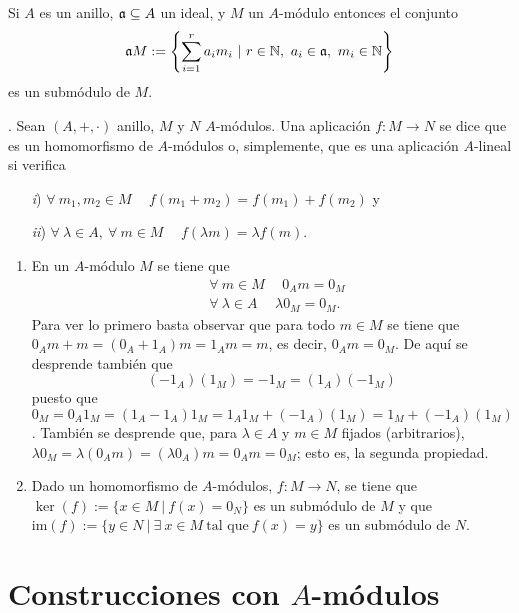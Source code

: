 \documentclass[../main.tex]{subfiles}
\begin{document}
\begin{remark} Si $A$ es un anillo, $\mathfrak{a}\subseteq A$ un ideal, y $M$ un $A$-módulo entonces el conjunto$$\af M:=\left\{\sum_{i=1}^ra_im_i\ |\ r\in\N,\ a_i\in\af,\ m_i\in\N\right\}$$es un submódulo de $M$.
\end{remark}

\begin{definition}. Sean $(A,+,\cdot)$ anillo, $M$ y $N$ $A$-módulos. Una aplicación $f:M\longrightarrow N$ se dice que es un homomorfismo de $A$-módulos o, simplemente, que es una aplicación $A$-lineal si verifica
\begin{itemize}
    \item[\textit{i})] $\forall\ m_1,m_2\in M\hspace{15pt} f(m_1+m_2)=f(m_1)+f(m_2)$ y
    \item[\textit{ii})] $\forall\ \lambda\in A,\ \forall\ m\in M\hspace{15pt} f(\lambda m)=\lambda f(m).$
\end{itemize}
\end{definition}

\begin{remark}
\begin{enumerate}
  \item En un $A$-módulo $M$ se tiene que\begin{align*}
      &\forall\ m\in M \hspace{15pt}0_Am=0_M\\
      &\forall\ \lambda\in A \hspace{15pt}\lambda0_M=0_M.
  \end{align*}
  Para ver lo primero basta observar que para todo $m\in M$ se tiene que $0_Am+m=(0_A+1_A)m=1_Am=m$, es decir, $0_Am=0_M$. De aquí se desprende también que $$(-1_A)(1_M)=-1_M=(1_A)(-1_M)$$ puesto que $0_M=0_A1_M=(1_A-1_A)1_M=1_A1_M+(-1_A)(1_M)=1_M+(-1_A)(1_M)$. También se desprende que, para $\lambda\in A$ y $m\in M$ fijados (arbitrarios), $\lambda0_M=\lambda(0_Am)=(\lambda0_A)m=0_Am=0_M$; esto es, la segunda propiedad.

  \item Dado un homomorfismo de $A$-módulos, $f:M\longrightarrow N$, se tiene que $\ker(f):=\{x\in M\ |\ f(x)=0_N\}$ es un submódulo de $M$ y que $\text{im}(f):=\{y\in N\ |\ \exists\ x\in M\ \text{tal que}\ f(x)=y\}$ es un submódulo de $N$.
\end{enumerate}
\end{remark}

\section{Construcciones con $A$-módulos}
\end{document}
